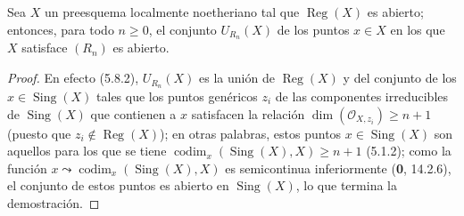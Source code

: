 \begin{proposition}[6.12.9]
\label{IV.2.s6.12.9-fr}
Sea $X$ un preesquema localmente noetheriano tal que $\operatorname{Reg}(X)$
es abierto; entonces, para todo $n\geq0$, el conjunto $U_{R_n}(X)$ de los
puntos $x\in X$ en los que $X$ satisface $(R_n)$ es abierto.
\end{proposition}

\begin{proof}
En efecto (5.8.2), $U_{R_n}(X)$ es la unión de $\operatorname{Reg}(X)$ y
del conjunto de los $x\in\operatorname{Sing}(X)$ tales que los puntos
genéricos $z_i$ de las componentes irreducibles de $\operatorname{Sing}(X)$
que contienen a $x$ satisfacen la relación
$\dim(\mathcal O_{X,z_i})\geq n+1$ (puesto que
$z_i\notin\operatorname{Reg}(X)$); en otras palabras, estos puntos
$x\in\operatorname{Sing}(X)$ son aquellos para los que se tiene
$\operatorname{codim}_x(\operatorname{Sing}(X),X)\geq n+1$ (5.1.2); como
la función $x\leadsto\operatorname{codim}_x(\operatorname{Sing}(X),X)$ es
semicontinua inferiormente (\textbf 0, 14.2.6), el conjunto de estos puntos es
abierto en $\operatorname{Sing}(X)$, lo que termina la demostración.
\end{proof}
